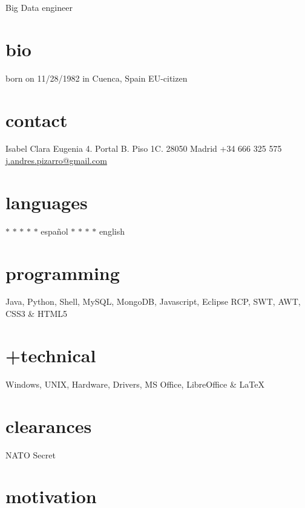 \documentclass[]{friggeri-cv}
\begin{document}
       {Big Data engineer}



\begin{aside} %
  \section{bio}
  born on 11/28/1982
  in Cuenca, Spain
  EU-citizen
  \section{contact}
  Isabel Clara Eugenia 4. 
  Portal B. Piso 1C.
  28050 Madrid
  +34 666 325 575
  \hyperref[mailto:j.andres.pizarro@gmail.com]{j.andres.pizarro@gmail.com}
  \section{languages}
  {\color{lightgray} $\ast$}{\color{lightgray} $\ast$}{\color{lightgray} $\ast$}{\color{lightgray} $\ast$}{\color{lightgray} $\ast$} español
  {\color{lightgray} $\ast$}{\color{lightgray} $\ast$}{\color{lightgray} $\ast$}{\color{lightgray} $\ast$} english
  \section{programming}
  Java, Python, Shell,
  MySQL, MongoDB, Javascript,
  Eclipse RCP, SWT, AWT,
  CSS3 \& HTML5
  \section{ +technical}
  Windows, UNIX,
  Hardware, Drivers,
  MS Office, LibreOffice \& \LaTeX
  \section{clearances}
  NATO Secret
\end{aside}


\section{motivation}
\end{document}
